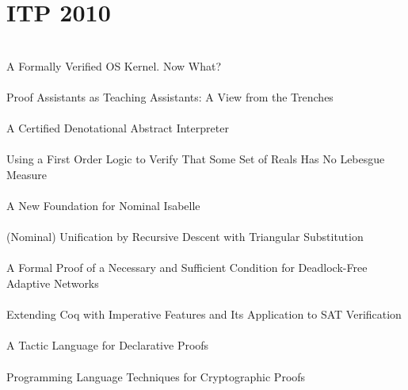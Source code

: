 \documentclass{article}
\begin{document}
\section{ITP 2010}

\cite{10-klein-what} \\
A Formally Verified {OS} Kernel.  Now What? \\

\cite{10-pierce-trenches} \\
Proof Assistants as Teaching Assistants: A View from the Trenches \\

\cite{10-cachera-denotational} \\
A Certified Denotational Abstract Interpreter \\

\cite{10-cowles-lebesgue} \\
Using a First Order Logic to Verify That Some Set of Reals Has No {Lebesgue} Measure \\

\cite{10-huffman-nominal} \\
A New Foundation for Nominal {Isabelle} \\

\cite{10-kumar-unification} \\
(Nominal) Unification by Recursive Descent with Triangular Substitution \\

\cite{10-verbeek-networks} \\
A Formal Proof of a Necessary and Sufficient Condition for Deadlock-Free Adaptive Networks \\

\cite{10-armand-imperative} \\
Extending {Coq} with Imperative Features and Its Application to {SAT} Verification \\

\cite{10-autexier-declarative} \\
A Tactic Language for Declarative Proofs \\

\cite{10-barthe-crypto} \\
Programming Language Techniques for Cryptographic Proofs \\
\end{document}
